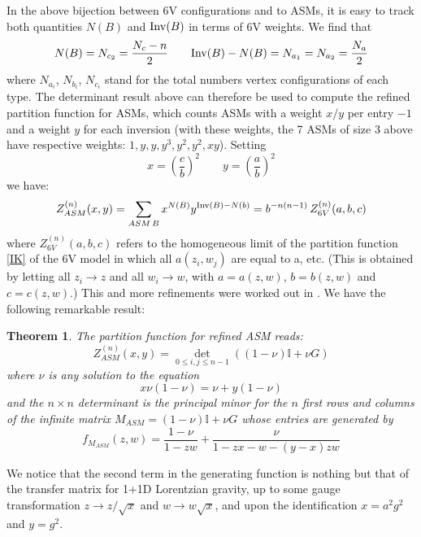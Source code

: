 \documentclass[12pt]{amsart}
\newtheorem{thm}{Theorem}[section]
\numberwithin{equation}{section}
\begin{document}
In the above bijection between 6V configurations and to ASMs, it is easy to track both quantities 
$N(B)$ and ${\rm Inv}(B)$ in terms of 6V weights.
We find that 
$$N(B)= N_{c_2}=\frac{N_c-n}{2} \qquad {\rm Inv}(B)-N(B)=N_{a_1}=N_{a_2}=\frac{N_{a}}{2}$$
where $N_{a_i}$, $N_{b_i}$, $N_{c_i}$ stand for the total numbers vertex configurations of each type.
The determinant result above can therefore be used to compute the refined partition function for ASMs, which 
counts ASMs with a weight $x/y$ per entry $-1$ and a weight $y$ for each inversion (with these weights, the 7
ASMs of size 3 above have respective weights: $1,y,y,y^3,y^2,y^2,x y$). Setting
\begin{equation}\label{xyab}
x=\left( \frac{c}{b}\right)^2\qquad y=\left( \frac{a}{b} \right)^2 
\end{equation}
we have:
\begin{equation}\label{zasm} 
Z_{ASM}^{(n)}(x,y)=\sum_{ASM\, B} x^{N(B)} y^{{\rm Inv}(B)-N(b)}=b^{-n(n-1)} \, Z_{6V}^{(n)}(a,b,c)
\end{equation}
where $Z_{6V}^{(n)}(a,b,c)$ refers to the homogeneous limit of the partition function \eqref{IK}
of the 6V model in which all $a(z_i,w_j)$
are equal to a, etc. (This is obtained by letting all $z_i\to z$ and all $w_i\to w$, with $a=a(z,w)$, $b=b(z,w)$ and $c=c(z,w)$.)
This and more refinements were worked out in \cite{BDZJ1}. We have the following remarkable result:

\begin{thm}\cite{BDZJ1}\label{asmthm}
The partition function for refined ASM reads:
\begin{equation}\label{asmdet}
Z_{ASM}^{(n)}(x,y)= \det_{0\leq i,j \leq n-1} \left ( (1-\nu){\mathbb I}+\nu G\right) 
\end{equation}
where $\nu$ is any solution to the equation
\begin{equation}\label{nudef} x \nu(1-\nu)=\nu +y(1-\nu)\end{equation}
and the $n\times n$ determinant is the principal minor for the $n$ first rows and columns of the infinite
matrix $ M_{ASM}=(1-\nu){\mathbb I}+\nu G$ whose entries are generated by
\begin{equation}\label{fasm} f_{M_{ASM}}(z,w)=\frac{1-\nu}{1-z w}+\frac {\nu}{1-z x-w -(y-x)z w} 
\end{equation}
\end{thm}

We notice that the second term in the generating function is nothing but that of the transfer matrix for 
1+1D Lorentzian gravity, up to some gauge transformation $z\to z/\sqrt{x}$ and $w\to w\sqrt{x}$,
and upon the identification $x=a^2g^2$ and $y=g^2$.
\end{document}

